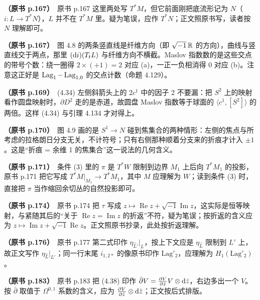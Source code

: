 \noindent \textbf{（原书 p.167）}\ 原书 p.167 这里两处写 $T^*M$，但它前面刚把底流形记为 $N$（$i\colon L\to T^*N$），$L$ 并不在 $T^*M$ 里。疑为笔误，应作 $T^*N$；正文照原书写，读者按 $N$ 理解即可。\par\smallskip

\noindent \textbf{（原书 p.167）}\ 图 4.8 的两条竖直线是纤维方向（即 $\sqrt{-1}\,\mathbb{R}$ 的方向），曲线与竖直线交于两点，那里 $(\mathrm{d} i)(T_tL)$ 与纤维方向不横截。Maslov 指数数的是这些交点的带号个数：绕一圈得 $2\times(+1)=2$ 对应 (a)，一正一负相消得 0 对应 (b)。注意这正好是 $\operatorname{Lag}_1-\operatorname{Lag}_{1,0}$ 的交点计数（命题 4.129）。\par\smallskip

\noindent \textbf{（原书 p.169）}\ (4.34) 左侧斜箭头上的 $2c^1$ 中的因子 2 不要漏：把 $S^2$ 上的映射看作圆盘映射时，$\partial D^2$ 走的是赤道，故圆盘 Maslov 指数等于球面的 $\langle c^1,[S^2]\rangle$ 的两倍。这样 (4.34) 与引理 4.134 才对得上。\par\smallskip

\noindent \textbf{（原书 p.170）}\ 图 4.9 画的是 $S^1\to N$ 碰到焦集合的两种情形：左侧的焦点与所考虑的拉格朗日分支无关，不计符号；只有右侧那种顺着分支来的折痕才计入 $\pm 1$。这是“折痕 = 余维 1 的焦集合”这一说法的几何含义。\par\smallskip

\noindent \textbf{（原书 p.171）}\ 条件 (3) 里的 $\pi$ 是 $T^*W$ 限制到边界 $M_1$ 上后向 $T^*M_1$ 的投影，原书 p.171 把它写成 $T^*M|_{M_1}\to T^*M_1$，其中 $M$ 应理解为 $W$；读到条件 (3) 时，直接把 $\pi$ 当作缩回余切丛的自然投影即可。\par\smallskip

\noindent \textbf{（原书 p.174）}\ 原书 p.174 把 $\tau$ 写成 $z\mapsto\operatorname{Re}z+\sqrt{-1}\operatorname{Im}z$，这实际是恒等映射，与紧随其后的“关于 $\operatorname{Re}z=\operatorname{Im}z$ 的折返”不符，疑为笔误；按折返的含义应为 $z\mapsto\operatorname{Im}z+\sqrt{-1}\operatorname{Re}z$。正文照原书抄录，此处按折返理解。\par\smallskip

\noindent \textbf{（原书 p.176）}\ 原书 p.177 第二式印作 $\eta_{\hat L'}|_L$，按上下文应是 $\eta_{\hat L}$ 限制到 $L'$ 上，故正文写作 $\eta_{\hat L}|_{L'}$；同一行末尾 $i_{1,2*}$ 的像原书印作 $\mathrm{Lag}'_2$，应理解为 $H_1(\mathrm{Lag}'_2)$。\par\smallskip

\noindent \textbf{（原书 p.183）}\ 原书 p.183 把 (4.38) 印作 $\bar\partial V=\frac{\partial V}{\partial\bar z}V\otimes\mathrm{d}\bar z$，右边多出一个 $V$。按 $\bar\partial$ 取值于 $\Omega^{0,1}$ 系数的含义，应为 $\frac{\partial V}{\partial\bar z}\otimes\mathrm{d}\bar z$；正文按后式排版。\par\smallskip

